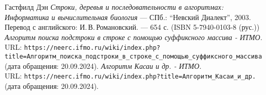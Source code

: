 \begin{thebibliography}{99}
    Гастфилд Дэн
    {\itshape Строки, деревья и последовательности в алгоритмах: Информатика и вычислительная биология} --- СПб.: \enquote{Невский Диалект}, 2003. Перевод с английского: И.\,В.\,Романовский. --- 654 с. (ISBN 5-7940-0103-8 (рус.))
    {\itshape Алгоритм поиска подстроки в строке с помощью суффиксного массива - ИТМО.} \\URL: \texttt{https://neerc.ifmo.ru/wiki/index.php?title=Алгоритм\_поиска\_подстроки\_в\_строке\_с\_помощью\_суффиксного\_массива} (дата обращения: 20.09.2024).
    {\itshape Алгоритм Касаи и др. - ИТМО.} \\URL: \texttt{https://neerc.ifmo.ru/wiki/index.php?title=Алгоритм\_Касаи\_и\_др.} (дата обращения: 20.09.2024).
    \end{thebibliography}
    \pagebreak
    
    
    